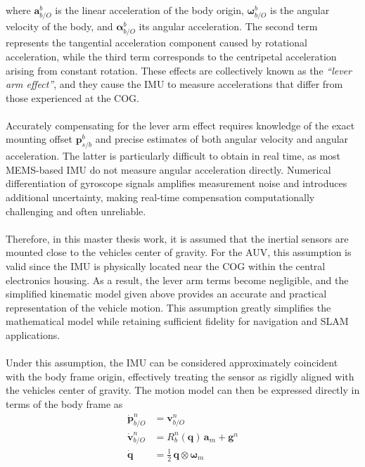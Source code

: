 where $\mathbf{a}_{b/O}^{b}$ is the linear acceleration of the body origin, $\boldsymbol{\omega}_{b/O}^{b}$ is the angular velocity of the body, and $\boldsymbol{\alpha}_{b/O}^{b}$ its angular acceleration. The second term represents the tangential acceleration component caused by rotational acceleration, while the third term corresponds to the centripetal acceleration arising from constant rotation. These effects are collectively known as the \textit{``lever arm effect''}, and they cause the IMU to measure accelerations that differ from those experienced at the COG.  
\\ \\
Accurately compensating for the lever arm effect requires knowledge of the exact mounting offset $\mathbf{p}_{s/b}^{b}$ and precise estimates of both angular velocity and angular acceleration. The latter is particularly difficult to obtain in real time, as most MEMS-based IMU do not measure angular acceleration directly. Numerical differentiation of gyroscope signals amplifies measurement noise and introduces additional uncertainty, making real-time compensation computationally challenging and often unreliable.  
\\ \\
Therefore, in this master thesis work, it is assumed that the inertial sensors are mounted close to the vehicles center of gravity. For the AUV, this assumption is valid since the IMU is physically located near the COG within the central electronics housing. As a result, the lever arm terms become negligible, and the simplified kinematic model given above provides an accurate and practical representation of the vehicle motion. This assumption greatly simplifies the mathematical model while retaining sufficient fidelity for navigation and SLAM applications.  
\\ \\
Under this assumption, the IMU can be considered approximately coincident with the body frame origin, effectively treating the sensor as rigidly aligned with the vehicles center of gravity. The motion model can then be expressed directly in terms of the body frame as
$$
\begin{aligned}
    \dot{\mathbf{p}}_{b/O}^{n} &= \mathbf{v}_{b/O}^{n} \\
    \dot{\mathbf{v}}_{b/O}^{n} &= R_b^n(\mathbf{q})\,\mathbf{a}_m + \mathbf{g}^n \\
    \dot{\mathbf{q}} &= \tfrac{1}{2}\,\mathbf{q} \otimes \boldsymbol{\omega}_m
\end{aligned}
$$
